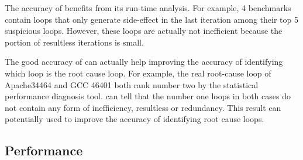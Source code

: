 The accuracy of \Tool benefits from its run-time analysis.
For example, 4 benchmarks contain loops that only generate side-effect
in the last iteration among their top 5 suspicious loops. However,
these loops are actually not inefficient because the portion of
resultless iterations is small. 

The good accuracy of \Tool can actually help improving the accuracy of
identifying which loop is the root cause loop.
For example, the real root-cause loop of Apache34464 and GCC 46401 both
rank number two by the statistical performance diagnosis tool.
\Tool can tell that the number one loops in both cases do not contain
any form of inefficiency, resultless or redundancy. This result can
potentially used to improve the accuracy of identifying root cause loops.


\subsection{Performance}
\label{sec:result_perf}

